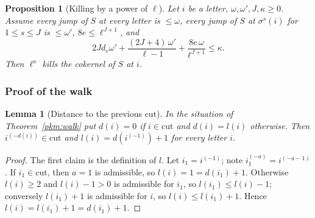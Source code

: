 \documentclass[10pt]{amsart}
\newtheorem{proposition}[theorem]{Proposition}
\newtheorem{lemma}[theorem]{Lemma}
\theoremstyle{definition}
\theoremstyle{remark}
\begin{document}
\begin{proposition}[Killing by a power of $\ell$]\label{pkm:kill-J}
Let $i$ be a letter, $\omega,\omega',J,\kappa\ge0$. Assume every jump of $S$ at every letter is
$\le\omega$, every jump of $S$ at $\sigma^s(i)$ for $1\le s\le J$ is $\le\omega'$, $8e\le\ell^{J+1}$,
and
\[
2Jd_v\omega'+\frac{(2J+4)\,\omega'}{\ell-1}+\frac{8e\,\omega}{\ell^{J+1}}\le\kappa .
\]
Then $\ell^\kappa$ kills the cokernel of $S$ at $i$.
\end{proposition}

\subsubsection{Proof of the walk}\label{pkm:ss-walk}

\begin{lemma}[Distance to the previous cut]\label{pkm:dist}
In the situation of Theorem~\ref{pkm:walk} put $d(i)=0$ if $i\in\mathrm{cut}$ and $d(i)=l(i)$
otherwise. Then $i^{(-d(i))}\in\mathrm{cut}$ and $l(i)=d(i^{(-1)})+1$ for every letter $i$.
\end{lemma}

\begin{proof}
The first claim is the definition of $l$. Let $i_1=i^{(-1)}$; note $i_1^{(-a)}=i^{(-a-1)}$. If
$i_1\in\mathrm{cut}$, then $a=1$ is admissible, so $l(i)=1=d(i_1)+1$. Otherwise $l(i)\ge2$ and
$l(i)-1>0$ is admissible for $i_1$, so $l(i_1)\le l(i)-1$; conversely $l(i_1)+1$ is admissible for
$i$, so $l(i)\le l(i_1)+1$. Hence $l(i)=l(i_1)+1=d(i_1)+1$.
\end{proof}
\end{document}

